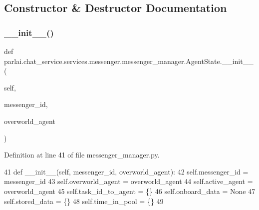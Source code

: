 \subsection{Constructor \& Destructor Documentation}
\mbox{\label{classparlai_1_1chat__service_1_1services_1_1messenger_1_1messenger__manager_1_1AgentState_ae384b64f65b58e2f8d9bee51af89f6cc}} 
\subsubsection{\texorpdfstring{\+\_\+\+\_\+init\+\_\+\+\_\+()}{\_\_init\_\_()}}
{\footnotesize\ttfamily def parlai.\+chat\+\_\+service.\+services.\+messenger.\+messenger\+\_\+manager.\+Agent\+State.\+\_\+\+\_\+init\+\_\+\+\_\+ (\begin{DoxyParamCaption}\item[{}]{self,  }\item[{}]{messenger\+\_\+id,  }\item[{}]{overworld\+\_\+agent }\end{DoxyParamCaption})}



Definition at line 41 of file messenger\+\_\+manager.\+py.


\begin{DoxyCode}
41     \textcolor{keyword}{def }\_\_init\_\_(self, messenger\_id, overworld\_agent):
42         self.messenger\_id = messenger\_id
43         self.overworld\_agent = overworld\_agent
44         self.active\_agent = overworld\_agent
45         self.task\_id\_to\_agent = \{\}
46         self.onboard\_data = \textcolor{keywordtype}{None}
47         self.stored\_data = \{\}
48         self.time\_in\_pool = \{\}
49 
\end{DoxyCode}


